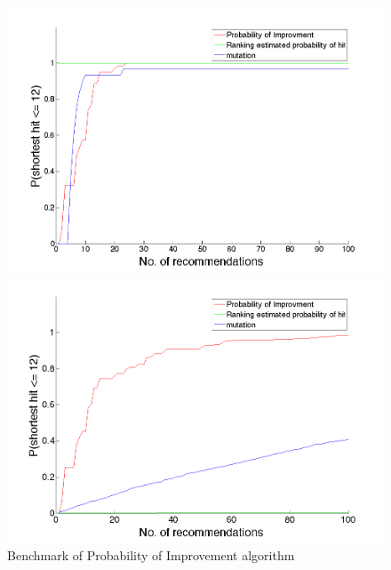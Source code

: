 \documentclass[12pt]{article}
\begin{document}
\begin{figure}[hpt] 
\center
\begin{minipage}{0.48\linewidth}
\includegraphics[width=\textwidth]{pic/PI2.png}
\end{minipage}
\begin{minipage}{0.47\linewidth}
\includegraphics[width=\textwidth]{pic/PI.png}
\end{minipage}
\caption{Benchmark of Probability of Improvement algorithm}
\label{fig:PI}
\end{figure}
\end{document}

